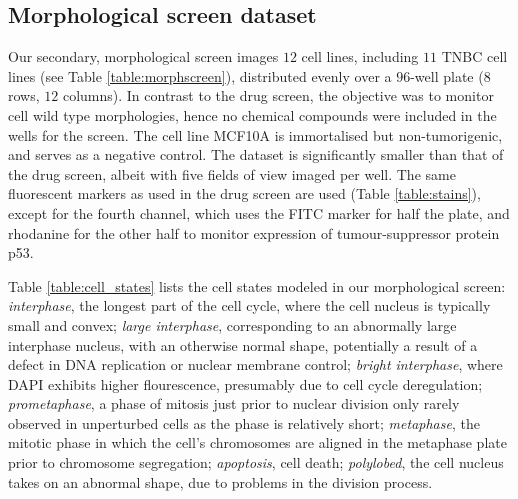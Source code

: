 
\subsection{Morphological screen dataset}
\label{subsec:morphogical}

Our secondary, morphological screen images $12$ cell lines, including $11$ TNBC cell lines (see Table \ref{table:morphscreen}), distributed evenly over a $96$-well plate ($8$ rows, $12$ columns). In contrast to the drug screen, the objective was to monitor cell wild type morphologies, hence no chemical compounds were included in the wells for the screen. The cell line MCF10A is immortalised but non-tumorigenic, and serves as a negative control. The dataset is significantly smaller than that of the drug screen, albeit with five fields of view imaged per well. The same fluorescent markers as used in the drug screen are used (Table \ref{table:stains}), except for the fourth channel, which uses the FITC marker for half the plate, and rhodanine for the other half to monitor expression of tumour-suppressor protein p53.

Table \ref{table:cell_states} lists the cell states modeled in our morphological screen: \emph{interphase}, the longest part of the cell cycle, where the cell nucleus is typically small and convex; \emph{large interphase}, corresponding to an abnormally large interphase nucleus, with an otherwise normal shape, potentially a result of a defect in DNA replication or nuclear membrane control; \emph{bright interphase}, where DAPI exhibits higher flourescence, presumably due to cell cycle deregulation; \emph{prometaphase}, a phase of mitosis just prior to nuclear division only rarely observed in unperturbed cells as the phase is relatively short; \emph{metaphase}, the mitotic phase in which the cell's chromosomes are aligned in the metaphase plate prior to chromosome segregation; \emph{apoptosis}, cell death; \emph{polylobed}, the cell nucleus takes on an abnormal shape, due to problems in the division process.

